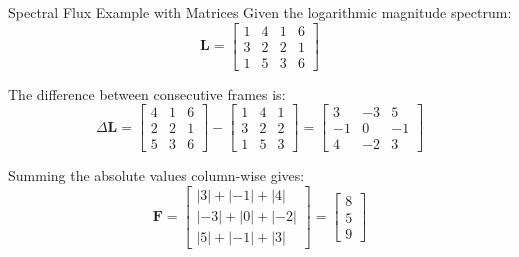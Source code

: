 \documentclass[aspectratio=169]{beamer}
\begin{document}
\begin{frame}{Spectral Flux Example with Matrices}
    \small
    Given the logarithmic magnitude spectrum:
    \[
    \mathbf{L} =
    \begin{bmatrix}
        1 & 4 & 1 & 6 \\
        3 & 2 & 2 & 1 \\
        1 & 5 & 3 & 6
    \end{bmatrix}
    \]

    The difference between consecutive frames is:
    \[
    \Delta \mathbf{L} =
    \begin{bmatrix}
        4 & 1 & 6 \\
        2 & 2 & 1 \\
        5 & 3 & 6
    \end{bmatrix}
    -
    \begin{bmatrix}
        1 & 4 & 1 \\
        3 & 2 & 2 \\
        1 & 5 & 3
    \end{bmatrix}
    =
    \begin{bmatrix}
        3 & -3 & 5 \\
        -1 & 0 & -1 \\
        4 & -2 & 3
    \end{bmatrix}
    \]

    Summing the absolute values column-wise gives:
    \[
    \mathbf{F} =
    \begin{bmatrix}
        |3|+|{-1}|+|4| \\
        |{-3}|+|0|+|{-2}| \\
        |5|+|{-1}|+|3|
    \end{bmatrix}
    =
    \begin{bmatrix}
        8 \\
        5 \\
        9
    \end{bmatrix}
    \]
\end{frame}
\end{document}
